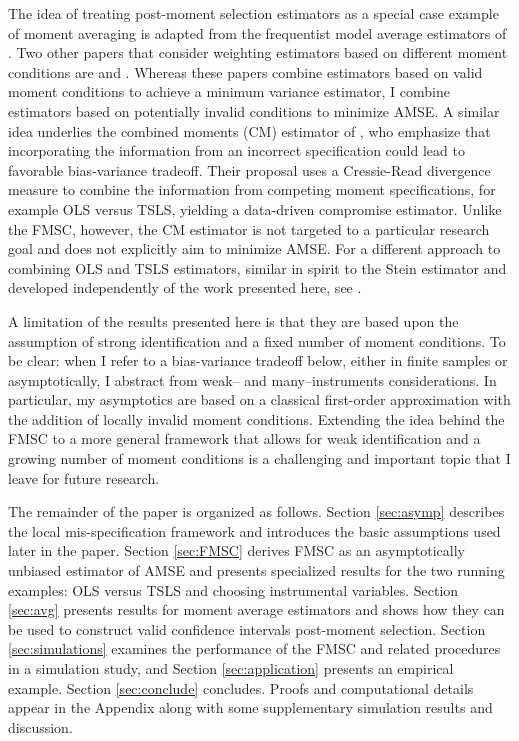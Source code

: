 The idea of treating post-moment selection estimators as a special case example of moment averaging is adapted from the frequentist model average estimators of \cite{HjortClaeskens}.
Two other papers that consider weighting estimators based on different moment conditions are \cite{Xiao} and \cite{ChenChavezLinton}.
Whereas these papers combine estimators based on valid moment conditions to achieve a minimum variance estimator, I combine estimators based on potentially invalid conditions to minimize AMSE. 
A similar idea underlies the combined moments (CM) estimator of \cite{Judge2007}, who emphasize that incorporating the information from an incorrect specification could lead to favorable bias-variance tradeoff. 
Their proposal uses a Cressie-Read divergence measure to combine the information from competing moment specifications, for example OLS versus TSLS, yielding a data-driven compromise estimator. Unlike the FMSC, however, the CM estimator is not targeted to a particular research goal and does not explicitly aim to minimize AMSE.
For a different approach to combining OLS and TSLS estimators, similar in spirit to the Stein estimator and developed independently of the work presented here, see \cite{Hansen2014}.

A limitation of the results presented here is that they are based upon the assumption of strong identification and a fixed number of moment conditions.
To be clear: when I refer to a bias-variance tradeoff below, either in finite samples or asymptotically, I abstract from weak-- and many--instruments considerations.
In particular, my asymptotics are based on a classical first-order approximation with the addition of locally invalid moment conditions.
Extending the idea behind the FMSC to a more general framework that allows for weak identification and a growing number of moment conditions is a challenging and important topic that I leave for future research.

The remainder of the paper is organized as follows.
Section \ref{sec:asymp} describes the local mis-specification framework and introduces the basic assumptions used later in the paper.
Section \ref{sec:FMSC} derives FMSC as an asymptotically unbiased estimator of AMSE and presents specialized results for the two running examples: OLS versus TSLS and choosing instrumental variables.
Section \ref{sec:avg} presents results for moment average estimators and shows how they can be used to construct valid confidence intervals post-moment selection.
Section \ref{sec:simulations} examines the performance of the FMSC and related procedures in a simulation study, and Section \ref{sec:application} presents an empirical example.
Section \ref{sec:conclude} concludes.
Proofs and computational details appear in the Appendix along with some supplementary simulation results and discussion.